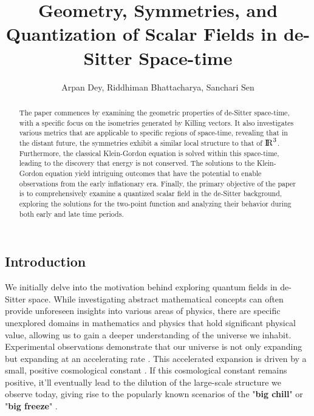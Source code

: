 \documentclass[a4paper,11pt]{article}
\title{\Huge \textbf{Geometry, Symmetries, and Quantization of Scalar Fields in de-Sitter Space-time}}
\author{\Large Arpan Dey, Riddhiman Bhattacharya, Sanchari Sen}
\date{}
\numberwithin{equation}{section}
\numberwithin{figure}{section}
\begin{document}
\begin{large}

\clearpage
\maketitle
\thispagestyle{empty}




\begin{abstract}
    The paper commences by examining the geometric properties of de-Sitter space-time, with a specific focus on the isometries generated by Killing vectors. It also investigates various metrics that are applicable to specific regions of space-time, revealing that in the distant future, the symmetries exhibit a similar local structure to that of ${\rm I\!R}^3$. Furthermore, the classical Klein-Gordon equation is solved within this space-time, leading to the discovery that energy is not conserved. The solutions to the Klein-Gordon equation yield intriguing outcomes that have the potential to enable observations from the early inflationary era. Finally, the primary objective of the paper is to comprehensively examine a quantized scalar field in the de-Sitter background, exploring the solutions for the two-point function and analyzing their behavior during both early and late time periods.
\end{abstract}


\newpage
\tableofcontents



\newpage

\section{\Large Introduction}

We initially delve into the motivation behind exploring quantum fields in de-Sitter space. While investigating abstract mathematical concepts can often provide unforeseen insights into various areas of physics, there are specific unexplored domains in mathematics and physics that hold significant physical value, allowing us to gain a deeper understanding of the universe we inhabit.
Experimental observations demonstrate that our universe is not only expanding but expanding at an accelerating rate \cite{Perlmutter_1999,Riess_1998}. This accelerated expansion is driven by a small, positive cosmological constant \cite{Bousso_2007}. If this cosmological constant remains positive, it'll eventually lead to the dilution of the large-scale structure we observe today, giving rise to the popularly known scenarios of the "\textbf{big chill}" or "\textbf{big freeze}" \cite{Nagamine_2003}.


\end{large}
\end{document}
